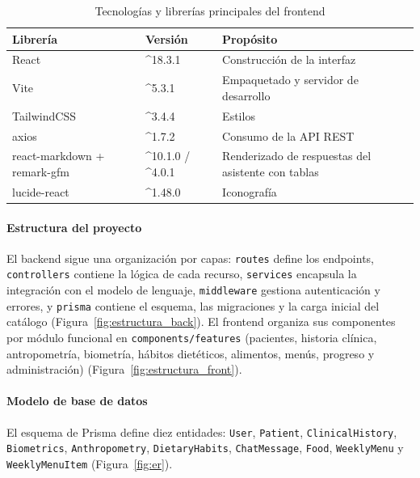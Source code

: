 \begin{table}[H]
\centering\small
\caption{Tecnologías y librerías principales del frontend}\label{tab:tec_front}
\begin{tabular}{|l|l|l|}
\hline
\textbf{Librería} & \textbf{Versión} & \textbf{Propósito} \\ \hline
React & \^{}18.3.1 & Construcción de la interfaz \\ \hline
Vite & \^{}5.3.1 & Empaquetado y servidor de desarrollo \\ \hline
TailwindCSS & \^{}3.4.4 & Estilos \\ \hline
axios & \^{}1.7.2 & Consumo de la API REST \\ \hline
react-markdown + remark-gfm & \^{}10.1.0 / \^{}4.0.1 & Renderizado de respuestas del asistente con tablas \\ \hline
lucide-react & \^{}1.48.0 & Iconografía \\ \hline
\end{tabular}
\end{table}

\paragraph{Estructura del proyecto}

El backend sigue una organización por capas: \texttt{routes} define los
endpoints, \texttt{controllers} contiene la lógica de cada recurso,
\texttt{services} encapsula la integración con el modelo de lenguaje,
\texttt{middleware} gestiona autenticación y errores, y \texttt{prisma} contiene
el esquema, las migraciones y la carga inicial del catálogo
(Figura~\ref{fig:estructura_back}). El frontend organiza sus componentes por
módulo funcional en \texttt{components/features} (pacientes, historia clínica,
antropometría, biometría, hábitos dietéticos, alimentos, menús, progreso y
administración) (Figura~\ref{fig:estructura_front}).


\paragraph{Modelo de base de datos}

El esquema de Prisma define diez entidades: \texttt{User}, \texttt{Patient},
\texttt{ClinicalHistory}, \texttt{Biometrics}, \texttt{Anthropometry},
\texttt{DietaryHabits}, \texttt{ChatMessage}, \texttt{Food},
\texttt{WeeklyMenu} y \texttt{WeeklyMenuItem} (Figura~\ref{fig:er}).

